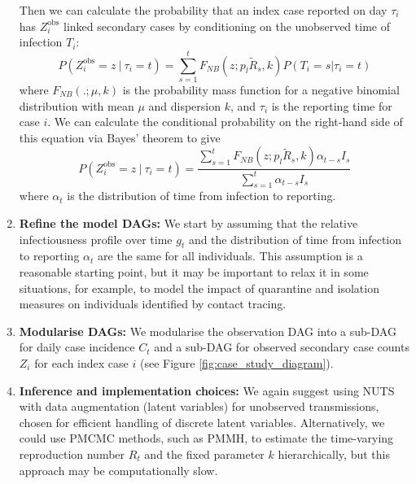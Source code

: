 \documentclass{article}
\begin{document}
\begin{enumerate}
   Then we can calculate the probability that an index case reported on day $\tau_i$ has $Z^\mathrm{obs}_i$ linked secondary cases by conditioning on the unobserved time of infection $T_i$:
   \begin{equation}
       P(Z^\mathrm{obs}_i=z \ | \ \tau_i=t) = \sum_{s=1}^{t} F_{NB}(z; p_l\tilde{R}_s,k) P(T_i=s | \tau_i=t)
   \end{equation}
where $F_{NB}(.;\mu,k)$ is the probability mass function for a negative binomial distribution with mean $\mu$ and dispersion $k$, and $\tau_i$ is the reporting time for case $i$.  We can calculate the conditional probability on the right-hand side of this equation via Bayes' theorem to give
   \begin{equation} \label{eq:Zobs}
       P(Z^\mathrm{obs}_i=z \ | \ \tau_i=t) = \frac{\sum_{s=1}^{t} F_{NB}(z; p_l\tilde{R}_s,k) \alpha_{t-s} I_s}{\sum_{s=1}^{t}\alpha_{t-s} I_s}  
   \end{equation}
 where $\alpha_t$ is the distribution of time from infection to reporting.

    \item \textbf{Refine the model DAGs:}  We start by assuming that the relative infectiousness profile over time $g_t$ and the distribution of time from infection to reporting $\alpha_t$ are the same for all individuals. This assumption is a reasonable starting point, but it may be important to relax it in some situations, for example, to model the impact of quarantine and isolation measures on individuals identified by contact tracing.

    \item \textbf{Modularise DAGs:} We modularise the observation DAG into a sub-DAG for daily case incidence $C_t$ and a sub-DAG for observed secondary case counts $Z_i$ for each index case $i$ (see Figure \ref{fig:case_study_diagram}).  
    
    \item \textbf{Inference and implementation choices:} We again suggest using \ac{NUTS} with data augmentation (latent variables) for unobserved transmissions, chosen for efficient handling of discrete latent variables. Alternatively, we could use \ac{PMCMC} methods, such as \ac{PMMH}, to estimate the time-varying reproduction number $R_t$ and the fixed parameter $k$ hierarchically, but this approach may be computationally slow. 


\end{enumerate}
\end{document}
